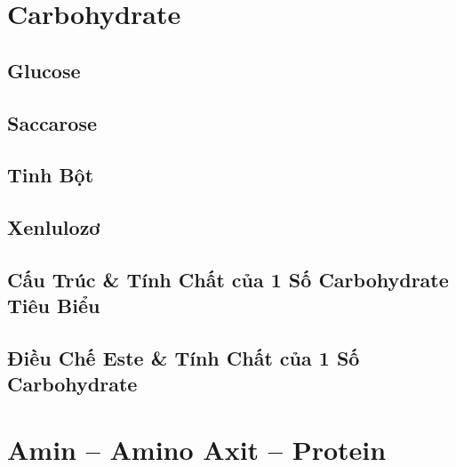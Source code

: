\documentclass{article}
\numberwithin{equation}{section}
\begin{document}
\section{Carbohydrate}

\subsection{Glucose}


\subsection{Saccarose}


\subsection{Tinh Bột}


\subsection{Xenlulozơ}


\subsection{Cấu Trúc \& Tính Chất của 1 Số Carbohydrate Tiêu Biểu}


\subsection{Điều Chế Este \& Tính Chất của 1 Số Carbohydrate}


\section{Amin -- Amino Axit -- Protein}
\end{document}
